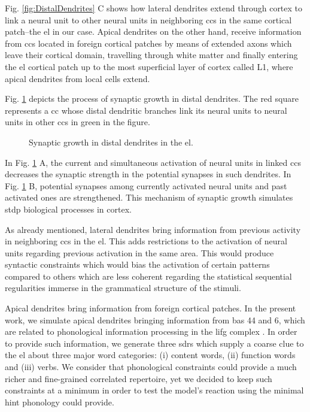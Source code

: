{Fig. \ref{fig:DistalDendrites} C shows how lateral dendrites extend through cortex to link a neural unit to other neural units in neighboring \glspl{cc} in the same cortical patch--the \gls{el} in our case. Apical dendrites on the other hand, receive information from \glspl{cc} located in foreign cortical patches by means of extended axons which leave their cortical domain, travelling through white matter and finally entering the \gls{el} cortical patch up to the most superficial layer of cortex called L1, where apical dendrites from local cells extend.


Fig. \ref{fig:DistalDendritesGrowth} depicts the process of synaptic growth in distal dendrites. The red square represents a \gls{cc} whose distal dendritic branches link its neural units to neural units in other \glspl{cc} in green in the figure.

\begin{figure}[h!]
    \centering
    \caption{Synaptic growth in distal dendrites in the \gls{el}.}
    \label{fig:DistalDendritesGrowth}
\end{figure}

 In Fig. \ref{fig:DistalDendritesGrowth} A, the current and simultaneous activation of neural units in linked \glspl{cc} decreases the synaptic strength in the potential synapses in such dendrites. In Fig. \ref{fig:DistalDendritesGrowth} B, potential synapses among currently activated neural units and past activated ones are strengthened. This mechanism of synaptic growth simulates \gls{stdp} biological processes in cortex.
 
 As already mentioned, lateral dendrites bring information from previous activity in neighboring \glspl{cc} in the \gls{el}. This adds restrictions to the activation of neural units regarding previous activation in the same area. This would produce syntactic constraints which would bias the activation of certain patterns compared to others which are less coherent regarding the statistical sequential regularities immerse in the grammatical structure of the stimuli.

Apical dendrites bring information from foreign cortical patches. In the present work, we simulate apical dendrites bringing information from \glspl{ba} 44 and 6, which are related to phonological information processing in the \gls{lifg} complex \cite{Lee3942, PMID:27381836, HEIM2003285,
PMID:18296070, AMUNTS200442}. In order to provide such information, we generate three \glspl{sdr} which supply a coarse clue to the \gls{el} about three major word categories: (i) content words, (ii) function words and (iii) verbs. We consider that phonological constraints could provide a much richer and fine-grained correlated repertoire, yet we decided to keep such constraints at a minimum in order to test the model's reaction using the minimal hint phonology could provide.
}













